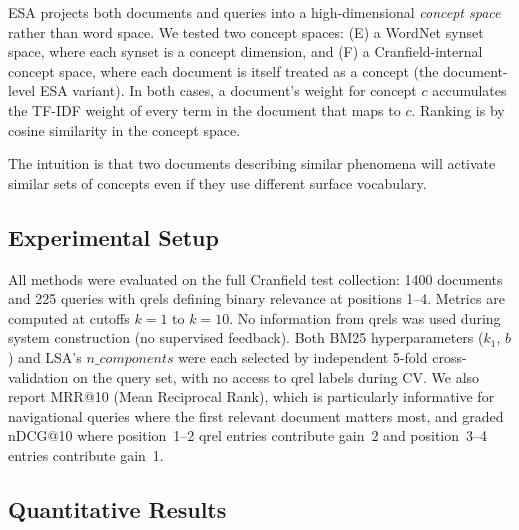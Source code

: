 \documentclass{svproc}
\begin{document}
    ESA projects both documents and queries into a high-dimensional \emph{concept space} rather than word space. We tested two concept spaces: (E) a WordNet synset space, where each synset is a concept dimension, and (F) a Cranfield-internal concept space, where each document is itself treated as a concept (the document-level ESA variant). In both cases, a document's weight for concept $c$ accumulates the TF-IDF weight of every term in the document that maps to $c$. Ranking is by cosine similarity in the concept space.

    The intuition is that two documents describing similar phenomena will activate similar sets of concepts even if they use different surface vocabulary.

    \subsection{Experimental Setup}

    All methods were evaluated on the full Cranfield test collection: 1400 documents and 225 queries with qrels defining binary relevance at positions 1--4. Metrics are computed at cutoffs $k{=}1$ to $k{=}10$. No information from qrels was used during system construction (no supervised feedback). Both BM25 hyperparameters ($k_1$, $b$) and LSA's $n\_components$ were each selected by independent 5-fold cross-validation on the query set, with no access to qrel labels during CV. We also report MRR@10 (Mean Reciprocal Rank), which is particularly informative for navigational queries where the first relevant document matters most, and graded nDCG@10 where position~1--2 qrel entries contribute gain~2 and position~3--4 entries contribute gain~1.

    \subsection{Quantitative Results}
\end{document}
